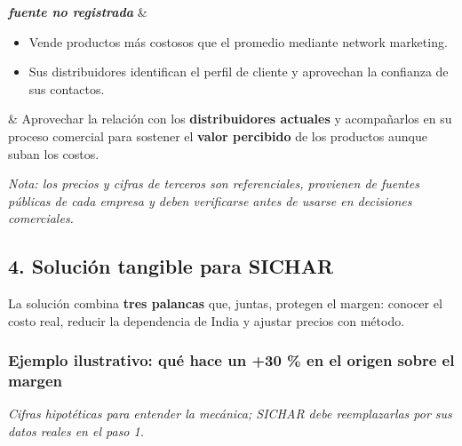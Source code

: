 \documentclass[11pt,a4paper]{article}
\begin{document}
\begin{longtable}[]
\emph{\textbf{fuente no registrada}} & \begin{minipage}[t]{\linewidth}\raggedright
\begin{itemize}
\item
  Vende productos más costosos que el promedio mediante network marketing.
\item
  Sus distribuidores identifican el perfil de cliente y aprovechan la confianza de sus contactos.
\end{itemize}
\end{minipage} & Aprovechar la relación con los \textbf{distribuidores actuales} y acompañarlos en
su proceso comercial para sostener el \textbf{valor percibido} de los productos aunque suban los
costos. \\
\end{longtable}

\emph{Nota: los precios y cifras de terceros son referenciales, provienen de fuentes públicas de
cada empresa y deben verificarse antes de usarse en decisiones comerciales.}


\hypertarget{soluciuxf3n-tangible-para-sichar-1}{%
\subsection*{4. Solución tangible para SICHAR}\label{soluciuxf3n-tangible-para-sichar-1}}

La solución combina \textbf{tres palancas} que, juntas, protegen el margen: conocer el costo real,
reducir la dependencia de India y ajustar precios con método.


\hypertarget{ejemplo-ilustrativo-quuxe9-hace-un-30-en-el-origen-sobre-el-margen}{%
\subsubsection*{Ejemplo ilustrativo: qué hace un +30 \% en el origen sobre el
margen}\label{ejemplo-ilustrativo-quuxe9-hace-un-30-en-el-origen-sobre-el-margen}}

\emph{Cifras hipotéticas para entender la mecánica; SICHAR debe reemplazarlas por sus datos reales
en el paso 1.}
\end{document}
